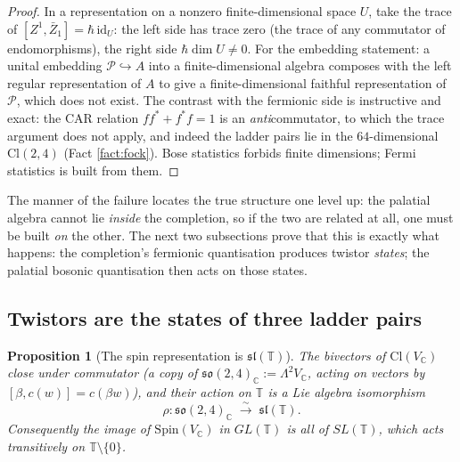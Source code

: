 \documentclass[11pt]{article}
\newtheorem{proposition}[theorem]{Proposition}
\theoremstyle{definition}
\newcommand{\Cl}{\mathrm{Cl}}
\newcommand{\C}{\mathbb{C}}
\newcommand{\T}{\mathbb{T}}
\begin{document}
\begin{proof}
In a representation on a nonzero finite-dimensional space $U$, take the trace of $[Z^1, \bar Z_1] = \hbar\,\mathrm{id}_U$: the left side has trace zero (the trace of any commutator of endomorphisms), the right side $\hbar\dim U \neq 0$. For the embedding statement: a unital embedding $\mathcal{P} \hookrightarrow A$ into a finite-dimensional algebra composes with the left regular representation of $A$ to give a finite-dimensional faithful representation of $\mathcal{P}$, which does not exist. The contrast with the fermionic side is instructive and exact: the CAR relation $ff^* + f^*f = 1$ is an \emph{anti}commutator, to which the trace argument does not apply, and indeed the ladder pairs lie in the $64$-dimensional $\Cl(2,4)$ (Fact \ref{fact:fock}). Bose statistics forbids finite dimensions; Fermi statistics is built from them.
\end{proof}

The manner of the failure locates the true structure one level up: the palatial algebra cannot lie \emph{inside} the completion, so if the two are related at all, one must be built \emph{on} the other. The next two subsections prove that this is exactly what happens: the completion's fermionic quantisation produces twistor \emph{states}; the palatial bosonic quantisation then acts on those states.

\subsection{Twistors are the states of three ladder pairs}\label{subsec:states}

\begin{proposition}[The spin representation is $\mathfrak{sl}(\T)$]\label{prop:spiniso}
The bivectors of $\Cl(V_\C)$ close under commutator (a copy of $\mathfrak{so}(2,4)_\C := \Lambda^2 V_\C$, acting on vectors by $[\beta, c(w)] = c(\beta w)$), and their action on $\T$ is a Lie algebra isomorphism
\[
\rho: \mathfrak{so}(2,4)_\C \;\xrightarrow{\ \sim\ }\; \mathfrak{sl}(\T) .
\]
Consequently the image of $\mathrm{Spin}(V_\C)$ in $GL(\T)$ is all of $SL(\T)$, which acts transitively on $\T\setminus\{0\}$.
\end{proposition}
\end{document}
